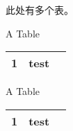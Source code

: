 此处有多个表。

\begin{table}[!hpb]
    \centering
      {A Table}
    \label{nli:t1}
    \begin{tabular}{@{}llr@{}} \toprule
      1  & 	test\\\bottomrule
    \end{tabular}
  \end{table}

\begin{table}[!hpb]
    \centering
      {A Table}
    \label{nli:t2}
    \begin{tabular}{@{}llr@{}} \toprule
      1  & 	test\\\bottomrule
    \end{tabular}
\end{table}

